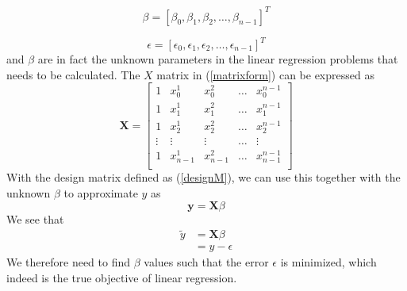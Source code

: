 \documentclass{article}
\begin{document}
\begin{equation}
\beta = [\beta_{0}, \beta_{1}, \beta_{2}, \dots, \beta_{n-1}]^{T}
\end{equation}

\begin{equation}
\epsilon = [\epsilon_{0}, \epsilon_{1}, \epsilon_{2}, \dots, \epsilon_{n-1}]^{T}
\end{equation}
and $\beta$ are in fact the unknown parameters in the linear regression problems that needs to be calculated. The $X$ matrix in (\ref{matrixform}) can be expressed as
\begin{equation} \label{designM}
\textbf{X} = 
\begin{bmatrix}
1 & x_{0}^{1} & x_{0}^{2} & \dots & x_{0}^{n-1} \\
1 & x_{1}^{1} & x_{1}^{2} & \dots & x_{1}^{n-1} \\
1 & x_{2}^{1} & x_{2}^{2} & \dots & x_{2}^{n-1} \\
\vdots & \vdots & \vdots & \dots & \vdots \\
1 & x_{n-1}^{1} & x_{n-1}^{2} & \dots & x_{n-1}^{n-1} \\ 
\end{bmatrix}
\end{equation}
With the design matrix defined as (\ref{designM}), we can use this together with the unknown $\beta$ to approximate $y$ as
\begin{equation}
\textbf{\~{y}} = \textbf{X}\beta
\end{equation}
We see that
\begin{align}
\tilde{y} &= \textbf{X}\beta \\
&= y - \epsilon
\end{align}
We therefore need to find $\beta$ values such that the error $\epsilon$ is minimized, which indeed is the true objective of linear regression.
\end{document}
